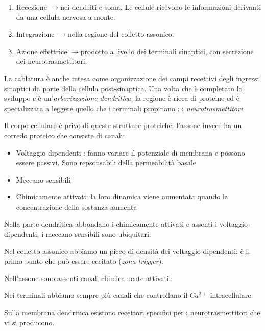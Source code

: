 \documentclass[a4paper,12pt]{article}
\newcommand{\lfreccia}{\ensuremath{\longrightarrow}}
\begin{document}
\begin{enumerate}
\item{Recezione \lfreccia nei dendriti e soma. Le cellule ricevono le informazioni derivanti da una cellula nervosa a monte.}
\item{Integrazione \lfreccia nella regione del colletto assonico.}
\item{Azione effettrice \lfreccia prodotto a livello dei terminali sinaptici, con secrezione dei neurotrasmettitori.}
\end{enumerate}

La cablatura è anche intesa come organizzazione dei campi recettivi degli ingressi sinaptici da parte della cellula post-sinaptica. Una volta che è completato lo sviluppo c'è un'\emph{arborizzazione dendritica}; la regione è ricca di proteine ed è specializzata a leggere quello che i terminali propinano : i \emph{neurotrasmettitori}.

Il corpo cellulare è privo di queste strutture proteiche; l'assone invece ha un corredo proteico che consiste di canali:
\begin{itemize}
\item{Voltaggio-dipendenti : fanno variare il potenziale di membrana e possono essere passivi. Sono repsonsabili della permeabilità basale}
\item{Meccano-sensibili}
\item{Chimicamente attivati: la loro dinamica viene aumentata quando la concentrazione della sostanza aumenta}
\end{itemize}

Nella parte dendritica abbondano i chimicamente attivati e assenti i voltaggio-dipendenti; i meccano-sensibili sono ubiquitari.

Nel colletto assonico abbiamo un picco di densità dei voltaggio-dipendenti: è il primo punto che può essere eccitato (\emph{zona trigger}).

Nell'assone sono assenti canali chimicamente attivati.

Nei terminali abbiamo sempre più canali che controllano il $Ca^{2+}$ intracellulare.

Sulla membrana dendritica esistono recettori specifici per i neurotrasmettitori che vi si producono.
\end{document}

